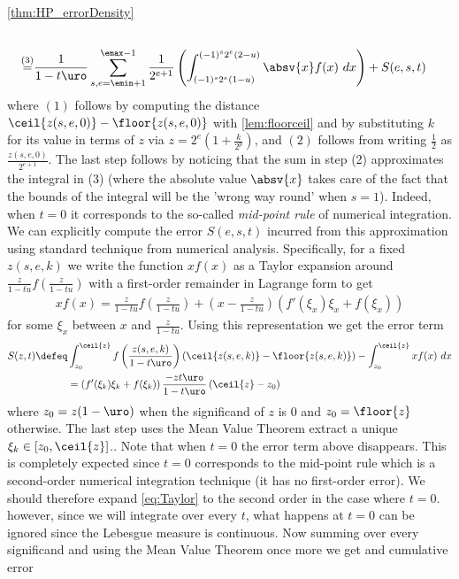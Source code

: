 \begin{myproof}{\cref{thm:HP_errorDensity}}
\begin{align}
\nonumber\\
\stackrel{(3)}{=} &  \frac{1}{1-t\uro} \sum_{s, e=\emin+1}^{\emax-1}\frac{1}{2^{e+1}} \left(\int_{(-1)^s2^e(1-u)}^{(-1)^s2^e(2-u)} \absv{x} f(x) ~dx \right) + S(e,s,t)\label{eq:case_one_half}
\end{align}
where $(1)$ follows by computing the distance $\ceil{z(s,e,0)}-\floor{z(s,e,0)}$ with \cref{lem:floorceil} and by substituting $k$ for its value in terms of $z$ via $z=2^e(1+\frac{k}{2^p})$, and $(2)$ follows from writing $\frac{1}{2}$ as $\frac{z(s,e,0)}{2^{e+1}}$. The last step follows by noticing that the sum in step (2) approximates the integral in (3) (where the absolute value $\absv{x}$ takes care of the fact that the bounds of the integral will be the 'wrong way round' when $s=1$).  Indeed, when $t=0$ it corresponds to the  so-called \emph{mid-point rule} of numerical integration. We can explicitly compute the error $S(e,s,t)$ incurred from this approximation using standard technique from numerical analysis. Specifically,  for a fixed $z(s,e,k)$ we write the function $xf(x)$ as a Taylor expansion around $\frac{z}{1-tu}f\left(\frac{z}{1-tu}\right)$ with a first-order remainder in Lagrange form to get
\begin{align}
xf(x) = \frac{z}{1-tu}f\left(\frac{z}{1-tu}\right) + \left(x- \frac{z}{1-tu}\right)\left(f'(\xi_x)\xi_x + f(\xi_x)\right)\label{eq:Taylor}
\end{align}
for some $\xi_x$ between $x$ and  $\frac{z}{1-tu}$.  Using this representation we get the error term
\begin{align*}
S(z, t) \defeq & \int_{z_0}^{\ceil{z}} f\left(\frac{z(s,e,k)}{1-t\uro}\right)(\ceil{z(s,e,k)}-\floor{z(s,e,k)})  - \int_{z_0}^{\ceil{z}} xf(x)~dx
\\
& = \left(f'(\xi_k)\xi_k + f(\xi_k)\right) \frac{-zt\uro}{1-t\uro}\left(\ceil{z}-z_0\right)
\end{align*}
where $z_{0}=z(1-\uro)$ when the significand of $z$ is 0 and $z_0=\floor{z}$ otherwise. The last step uses the Mean Value Theorem extract a unique $\xi_k\in[z_0,\ceil{z}]$.. Note that when $t=0$ the error term above disappears. This is completely expected since $t=0$ corresponds to the mid-point rule which is a second-order numerical integration technique (it has no first-order error). We should therefore expand \cref{eq:Taylor} to the second order in the case where $t=0$. however, since we will integrate over every $t$, what happens at $t=0$ can be ignored since the Lebesgue measure is continuous.  Now summing over every significand and using the Mean Value Theorem once more we get and cumulative error

\end{myproof}
